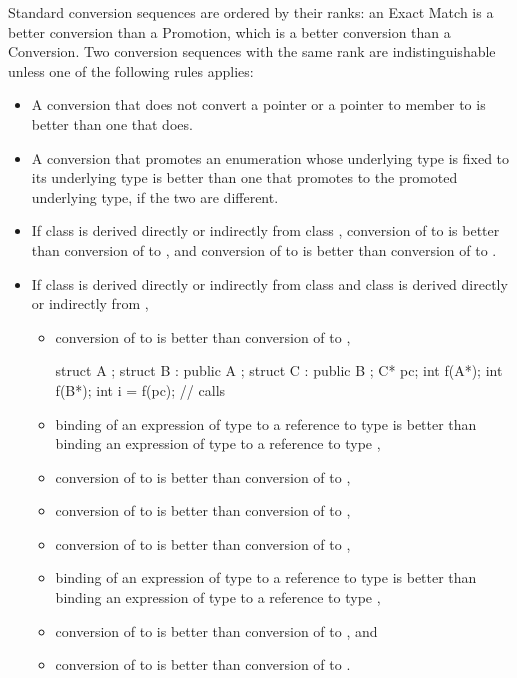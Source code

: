 \pnum
Standard conversion sequences are ordered by their ranks: an Exact Match is a
better conversion than a Promotion, which is a better conversion than
a Conversion.
Two conversion sequences with the same rank are indistinguishable unless
one of the following rules applies:

\begin{itemize}
\item
A conversion that does not convert a pointer or a pointer to member
to
is better than one that does.

\item
A conversion that promotes an enumeration whose underlying type is fixed to its underlying
type is better than one that promotes to the promoted underlying type, if the two are
different.

\item
If class
is derived directly or indirectly from class
,
conversion of
to
is better than conversion of
to
,
and conversion of
to
is better than conversion
of
to
.
\item
If class
is derived directly or indirectly from class
and class
is derived directly or indirectly from
,

\begin{itemize}
\item
conversion of
to
is better than conversion of
to
,
\begin{example}

\begin{codeblock}
struct A {};
struct B : public A {};
struct C : public B {};
C* pc;
int f(A*);
int f(B*);
int i = f(pc);                  // calls 
\end{codeblock}
\end{example}

\item
binding of an expression of type
to a reference to type
is better than binding an expression of type
to a reference to type
,
\item
conversion of
to
is better than conversion of
to
,
\item
conversion of
to
is better than conversion of
to
,
\item
conversion of
to
is better than conversion of
to
,
\item
binding of an expression of type
to a reference to type
is better than binding an expression of type
to a
reference to type
,
\item
conversion of
to
is better than conversion
of
to
,
and
\item
conversion of
to
is better than conversion of
to
.
\end{itemize}


\end{itemize}
